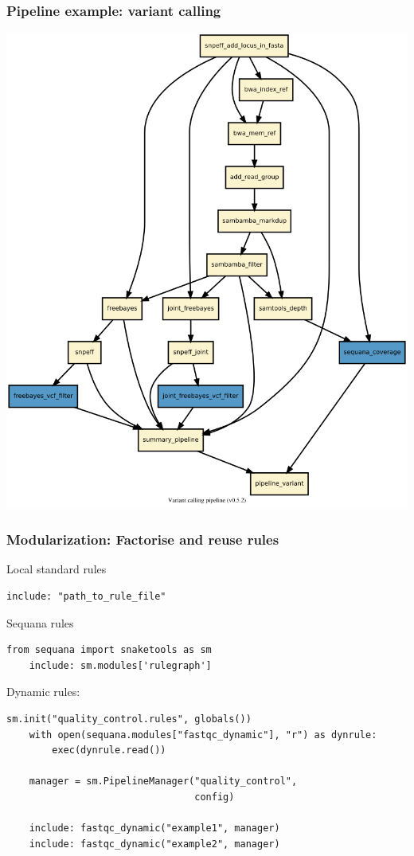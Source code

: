 \documentclass{beamer}
\begin{document}
\begin{frame}
\frametitle{Pipeline example: variant calling} 
\centering
\includegraphics[height=0.8\textheight, 
width=\textwidth]{./images/variant_calling_dag.png}
\end{frame}


\begin{frame}[fragile]
 \frametitle{Modularization: Factorise and reuse rules}

 
 Local standard rules
\begin{lstlisting}[basicstyle=\ttfamily\small] 
    include: "path_to_rule_file"
\end{lstlisting}

Sequana rules
\begin{lstlisting}[basicstyle=\ttfamily\small]
    from sequana import snaketools as sm
    include: sm.modules['rulegraph']
\end{lstlisting}

Dynamic rules:
\begin{lstlisting}[basicstyle=\ttfamily\small]
    sm.init("quality_control.rules", globals())
    with open(sequana.modules["fastqc_dynamic"], "r") as dynrule:
        exec(dynrule.read())
        
    manager = sm.PipelineManager("quality_control", 
                                 config)

    include: fastqc_dynamic("example1", manager)
    include: fastqc_dynamic("example2", manager)
\end{lstlisting}
\end{frame}
\end{document}
